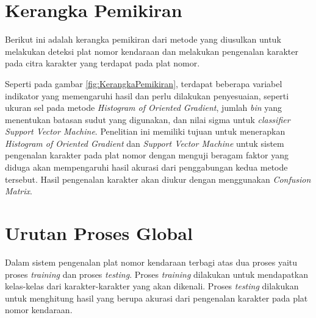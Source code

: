 \section{Kerangka Pemikiran}
\noindent Berikut ini adalah kerangka pemikiran dari metode yang diusulkan untuk melakukan deteksi plat nomor kendaraan dan melakukan pengenalan karakter pada citra karakter yang terdapat pada plat nomor.
\\
\begin{adjustbox}{width=1\textwidth}
	\noindent
	\begin{minipage}{\linewidth}
		\label{fig:KerangkaPemikiran}
	\end{minipage}
\end{adjustbox}
\noindent Seperti pada gambar \ref{fig:KerangkaPemikiran}, terdapat beberapa variabel indikator yang memengaruhi hasil dan perlu dilakukan penyesuaian, seperti ukuran sel pada metode \textit{Histogram of Oriented Gradient}, jumlah \textit{bin} yang menentukan batasan sudut yang digunakan, dan nilai sigma untuk \textit{classifier} \textit{Support Vector Machine}. Penelitian ini memiliki tujuan untuk menerapkan \textit{Histogram of Oriented Gradient} dan \textit{Support Vector Machine} untuk sistem pengenalan karakter pada plat nomor dengan menguji beragam faktor yang diduga akan mempengaruhi hasil akurasi dari penggabungan kedua metode tersebut. Hasil pengenalan karakter akan diukur dengan menggunakan \textit{Confusion Matrix}.\\

\section{Urutan Proses Global}
\noindent Dalam sistem pengenalan plat nomor kendaraan terbagi atas dua proses yaitu proses \textit{training} dan proses \textit{testing}. Proses \textit{training} dilakukan untuk mendapatkan kelas-kelas dari karakter-karakter yang akan dikenali. Proses \textit{testing} dilakukan untuk menghitung hasil yang berupa akurasi dari pengenalan karakter pada plat nomor kendaraan.\\

